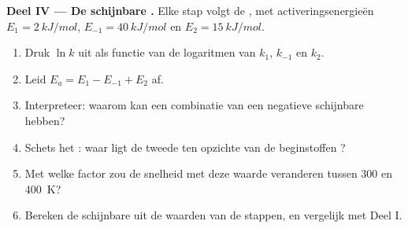 \begin{problem}
\medskip
\noindent\textbf{Deel IV --- De schijnbare .}
Elke stap volgt de , met activeringsenergieën $E_1 =
\qty{2}{kJ/mol}$, $E_{-1} = \qty{40}{kJ/mol}$ en $E_2 =
\qty{15}{kJ/mol}$.
\begin{enumerate}[resume]
  \item Druk $\ln k$ uit als functie van de logaritmen van $k_1$,
        $k_{-1}$ en $k_2$.
  \item Leid $E_a = E_1 - E_{-1} + E_2$ af.
  \item Interpreteer: waarom kan een combinatie van 
        een negatieve schijnbare  hebben?
  \item Schets het : waar ligt de tweede 
        ten opzichte van de beginstoffen ?
  \item Met welke factor zou de snelheid met deze waarde veranderen tussen
        300 en \qty{400}{K}?
  \item Bereken de schijnbare  uit de waarden van de
        stappen, en vergelijk met Deel I.
\end{enumerate}
\end{problem}
